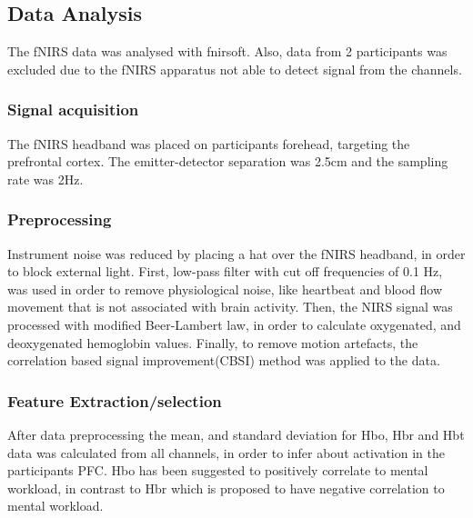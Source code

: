 \documentclass[../main/Feedback.tex]{subfiles}
\begin{document}
\subsection{Data Analysis}
The fNIRS data was analysed with fnirsoft\cite{ayazfunctional}. Also, data from 2 participants was excluded due to the fNIRS apparatus not able to detect signal from the channels.
\subsubsection{Signal acquisition}
The fNIRS headband was placed on participants forehead, targeting the prefrontal cortex. The emitter-detector separation was 2.5cm and the sampling rate was 2Hz.
\subsubsection{Preprocessing}
Instrument noise was reduced by placing a hat over the fNIRS headband, in order to block external light.
First, low-pass filter with cut off frequencies of 0.1 Hz, was used in order to remove physiological noise, like heartbeat and blood flow movement that is not associated with brain activity.
Then, the NIRS signal was processed with modified Beer-Lambert law\cite{cope1988system}, in order to calculate oxygenated, and deoxygenated hemoglobin values.
Finally, to remove motion artefacts, the correlation based signal improvement(CBSI)\cite{cui2010functional} method was applied to the data.
\subsubsection{Feature Extraction/selection}
After data preprocessing the mean, and standard deviation for Hbo, Hbr and Hbt data was calculated from all channels, in order to infer about activation in the participants PFC. Hbo has been suggested to positively correlate to mental workload\cite{peck2013using}, in contrast to Hbr which is proposed to have negative correlation to mental workload.\\
\end{document}
